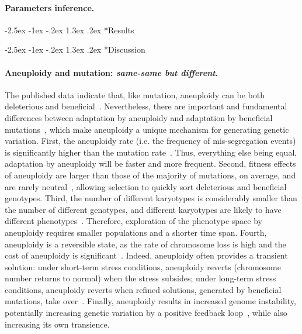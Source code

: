 \documentclass[12pt]{extarticle}
\makeatletter
\renewcommand\section{\@startsection {section}{1}{\z@}%
     {-2.5ex \@plus -1ex \@minus -.2ex}%
     {1.3ex \@plus.2ex}%
    {\Large\bfseries}}
\makeatother
\begin{document}
\paragraph*{Parameters inference.}  



 
\pagebreak
\section*{Results}

\pagebreak
\section*{Discussion}

\paragraph*{Aneuploidy and mutation: \textit{same-same but different}.}
The published data indicate that, like mutation, aneuploidy can be both deleterious and beneficial~\citep{Pavelka2010, Sheltzer2011}.
Nevertheless, there are important and fundamental differences between adaptation by aneuploidy
and adaptation by beneficial mutations~\citep{Yona2015}, which make aneuploidy a unique mechanism for generating genetic
variation.
First, the aneuploidy rate (i.e. the frequency of mis-segregation events) is significantly higher than the
mutation rate~\citep{Santaguida2015review}.
Thus, everything else being equal, adaptation by aneuploidy will be faster and more frequent.
Second, fitness effects of aneuploidy are larger than those of the majority of mutations, on average, and are rarely
neutral~\citep{Pavelka2010, Yona2012, Sunshine2015}, allowing selection to quickly sort deleterious and beneficial genotypes.
Third, the number of different karyotypes is considerably smaller than the number of different genotypes, and different karyotypes are likely to have different phenotypes~\citep{Pavelka2010}.
Therefore, exploration of the phenotype space by aneuploidy requires smaller populations and a shorter time span.
Fourth, aneuploidy is a reversible state, as the rate of chromosome loss is high and the cost of aneuploidy is significant~\citep{Niwa2006}.
Indeed, aneuploidy often provides a transient solution: under short-term stress conditions, aneuploidy reverts (chromosome number returns to normal) when the stress subsides; under long-term stress conditions, aneuploidy reverts when refined solutions, generated by beneficial mutations, take over~\citep{Yona2012}.
Finally, aneuploidy results in increased genome instability, potentially increasing genetic variation by a positive feedback loop~\citep{Rancati2013, Bouchonville2009, Zhu2012}, while also increasing its own transience.
\end{document}
